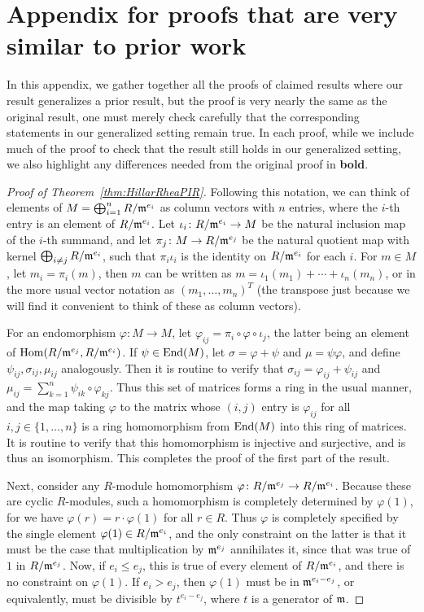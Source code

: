 
\section{Appendix for proofs that are very similar to prior work} \label{app:similar}
In this appendix, we gather together all the proofs of claimed results where our result generalizes a prior result, but the proof is very nearly the same as the original result, one must merely check carefully that the corresponding statements in our generalized setting remain true. In each proof, while we include much of the proof to check that the result still holds in our generalized setting, we also highlight any differences needed from the original proof in \textbf{bold}.

\begin{proof}[Proof of Theorem~\ref{thm:HillarRheaPIR}]
Following this notation, we can think of elements of $M = \bigoplus_{i=1}^n R/\mathfrak{m}^{e_i}$ as column vectors with $n$ entries, where the $i$-th entry is an element of $R/\mathfrak{m}^{e_i}$. Let $\iota_i \colon R/\mathfrak{m}^{e_i} \to M$ be the natural inclusion map of the $i$-th summand, and let $\pi_j \colon M \to R/\mathfrak{m}^{e_j}$ be the natural quotient map with kernel $\bigoplus_{i \neq j} R/\mathfrak{m}^{e_i}$, such that $\pi_i \iota_i$ is the identity on $R/\mathfrak{m}^{e_i}$ for each $i$. For $m \in M$, let $m_i = \pi_i(m)$, then $m$ can be written as $m = \iota_1(m_1) + \dotsb + \iota_n(m_n)$, or in the more usual vector notation as $(m_1, \dotsc, m_n)^T$ (the transpose just because we will find it convenient to think of these as column vectors). 

For an endomorphism $\varphi \colon M \to M$, let $\varphi_{ij} = \pi_i \circ \varphi \circ \iota_j$, the latter being an element of $\mathrm{Hom}(R/\mathfrak{m}^{e_j}, R/\mathfrak{m}^{e_i})$. If $\psi \in \mathrm{End}(M)$, let $\sigma = \varphi + \psi$ and $\mu = \psi \varphi$, and define $\psi_{ij}, \sigma_{ij}, \mu_{ij}$ analogously. Then it is routine to verify that $\sigma_{ij} = \varphi_{ij} + \psi_{ij}$ and $\mu_{ij} = \sum_{k=1}^n \psi_{ik} \circ \varphi_{kj}$. Thus this set of matrices forms a ring in the usual manner, and the map taking $\varphi$ to the matrix whose $(i,j)$ entry is $\varphi_{ij}$ for all $i,j \in \{1,\dotsc,n\}$ is a ring homomorphism from $\mathrm{End}(M)$ into this ring of matrices. It is routine to verify that this homomorphism is injective and surjective, and is thus an isomorphism. This completes the proof of the first part of the result.

Next, consider any $R$-module homomorphism $\varphi \colon R/\mathfrak{m}^{e_j} \to R/\mathfrak{m}^{e_i}$. Because these are cyclic $R$-modules, such a homomorphism is completely determined by $\varphi(1)$, for we have $\varphi(r) = r \cdot \varphi(1)$ for all $r \in R$. Thus $\varphi$ is completely specified by the single element $\varphi(1) \in R/\mathfrak{m}^{e_i}$, and the only constraint on the latter is that it must be the case that multiplication by $\mathfrak{m}^{e_j}$ annihilates it, since that was true of $1$ in $R/\mathfrak{m}^{e_j}$. Now, if $e_i \leq e_j$, this is true of every element of $R/\mathfrak{m}^{e_i}$, and there is no constraint on $\varphi(1)$. If $e_i > e_j$, then $\varphi(1)$ must be in $\mathfrak{m}^{e_i - e_j}$, or equivalently, must be divisible by $t^{e_i - e_j}$, where $t$ is a generator of $\mathfrak{m}$.


\end{proof}
